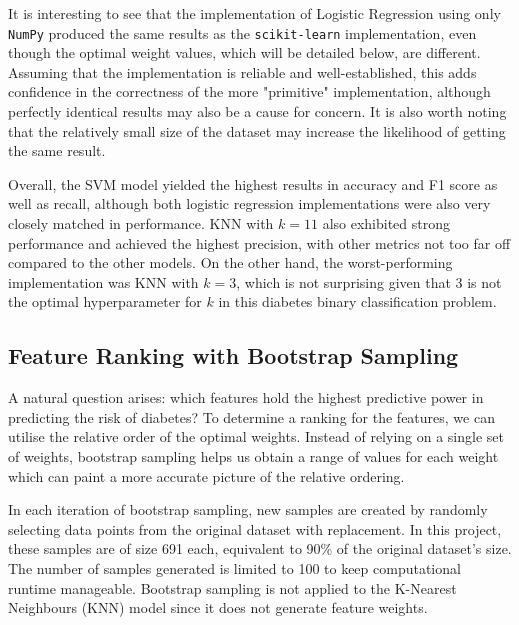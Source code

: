 \documentclass[12pt]{article}
\begin{document}
It is interesting to see that the implementation of Logistic Regression using only \texttt{NumPy}\cite{numpy-website} produced the same results as the \texttt{scikit-learn}\cite{sklearn-logisticregression} implementation, even though the optimal weight values, which will be detailed below, are different.
Assuming that the  implementation is reliable and well-established, this adds confidence in the correctness of the more "primitive" implementation, although perfectly identical results may also be a cause for concern. It is also worth noting that the relatively small size of the dataset may increase the likelihood of getting the same result.


Overall, the SVM model yielded the highest results in accuracy and F1 score as well as recall, although both logistic regression implementations were also very closely matched in performance. KNN with \(k = 11\) also exhibited strong performance and achieved the highest precision, with other metrics not too far off compared to the other models. On the other hand, the worst-performing implementation was KNN with \(k = 3\), which is not surprising given that \(3\) is not the optimal hyperparameter for \(k\) in this diabetes binary classification problem.



\subsection{Feature Ranking with Bootstrap Sampling}

A natural question arises: which features hold the highest predictive power in predicting the risk of diabetes? To determine a ranking for the features, we can utilise the relative order of the optimal weights.
Instead of relying on a single set of weights,
bootstrap sampling helps us obtain a range of values for each weight which can paint a more accurate picture of the relative ordering.



In each iteration of bootstrap sampling, new samples are created by randomly selecting data points from the original dataset with replacement. In this project, these samples are of size 691 each, equivalent to %
90\% of the original dataset's size. 
The number of samples generated is limited to 100 to keep computational runtime manageable.
Bootstrap sampling is not applied to the K-Nearest Neighbours (KNN) model since it does not generate feature weights.
\end{document}
